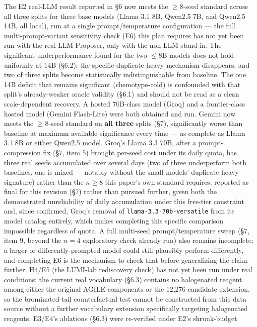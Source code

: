 \documentclass{article}
\begin{document}
The E2 real-LLM result reported in \S6 now meets the $\ge 8$-seed standard
across all three splits for three base models (Llama 3.1 8B, Qwen2.5 7B,
and Qwen2.5 14B, all local), run at a single prompt/temperature
configuration --- the full multi-prompt-variant sensitivity check (E6)
this plan requires has not yet been run with the real LLM Proposer, only
with the non-LLM stand-in. The significant underperformance found for the
two $\le$8B models does not hold uniformly at 14B (\S6.2): the specific
duplicate-heavy mechanism disappears, and two of three splits become
statistically indistinguishable from baseline. The one 14B deficit that
remains significant (chemotype-cold) is confounded with that split's
already-weaker oracle validity (\S6.1) and should not be read as a clean
scale-dependent recovery. A hosted 70B-class model (Groq) and a
frontier-class hosted model (Gemini Flash-Lite) were both obtained and
run. Gemini now meets the $\ge8$-seed standard on \textbf{all three}
splits (\S7), significantly worse than baseline at maximum available
significance every time --- as complete as Llama 3.1 8B or either Qwen2.5
model. Groq's Llama 3.3 70B, after a prompt-compression fix (\S7,
item 5) brought per-seed cost under its daily quota, has three real seeds
accumulated over several days (two of three underperform both baselines,
one is mixed --- notably without the small models' duplicate-heavy
signature) rather than the $n\ge8$ this paper's own standard requires;
reported as final for this revision (\S7) rather than pursued further,
given both the demonstrated unreliability of daily accumulation under
this free-tier constraint and, since confirmed, Groq's removal of
\texttt{llama-3.3-70b-versatile} from its model catalog entirely, which
makes completing this specific comparison impossible regardless of
quota. A full multi-seed prompt/temperature sweep (\S7, item 9, beyond the $n=4$
exploratory check already run) also remains incomplete; a larger or
differently-prompted model could still plausibly perform differently, and
completing E6 is the mechanism to check that before generalizing the
claim further.
H4/E5 (the
LUMI-lab rediscovery check) has not yet
been run under real conditions: the current real vocabulary (\S6.3)
contains no halogenated reagent among either the original AGILE
components or the 12,276-candidate extension, so the brominated-tail
counterfactual test cannot be constructed from this data source without a
further vocabulary extension specifically targeting halogenated reagents.
E3/E4's ablations (\S6.3) were re-verified under E2's shrunk-budget
\end{document}
